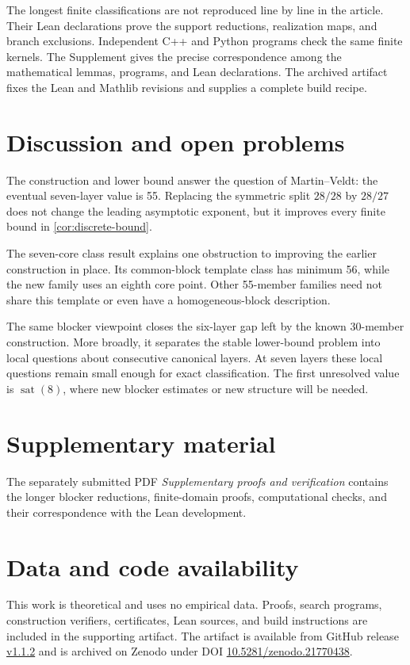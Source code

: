 \documentclass[a4paper,fleqn,longmktitle]{cas-sc}
\theoremstyle{definition}
\theoremstyle{remark}
\newcommand{\sat}{\operatorname{sat}}
\begin{document}
The longest finite classifications are not reproduced line by line in the
article.  Their Lean declarations prove the support reductions, realization
maps, and branch exclusions.  Independent C++ and Python programs check the
same finite kernels.  The Supplement gives the precise correspondence among
the mathematical lemmas, programs, and Lean declarations.  The archived
artifact fixes the Lean and Mathlib revisions and supplies a complete build
recipe.

\section{Discussion and open problems}

The construction and lower bound answer the question of Martin--Veldt: the
eventual seven-layer value is 55.  Replacing the symmetric split $28/28$ by
$28/27$ does not change the leading asymptotic exponent, but it improves every
finite bound in \cref{cor:discrete-bound}.

The seven-core class result explains one obstruction to improving the earlier
construction in place.  Its common-block template class has minimum 56, while
the new family uses an eighth core point.  Other 55-member families need not
share this template or even have a homogeneous-block description.

The same blocker viewpoint closes the six-layer gap left by the known
30-member construction.  More broadly, it separates the stable lower-bound
problem into local questions about consecutive canonical layers.  At seven
layers these local questions remain small enough for exact classification.
The first unresolved value is $\sat(8)$, where new blocker estimates or new
structure will be needed.

\section*{Supplementary material}

The separately submitted PDF \emph{Supplementary proofs and verification}
contains the longer blocker reductions, finite-domain proofs, computational
checks, and their correspondence with the Lean development.

\section*{Data and code availability}

This work is theoretical and uses no empirical data.  Proofs, search programs,
construction verifiers, certificates, Lean sources, and build instructions
are included in the supporting artifact.  The artifact is available from
GitHub release
\href{https://github.com/lailai0916/saturated-sperner-6-7/releases/tag/v1.1.2}
{v1.1.2} and is archived on Zenodo under DOI
\href{https://doi.org/10.5281/zenodo.21770438}{10.5281/zenodo.21770438}.
\end{document}

